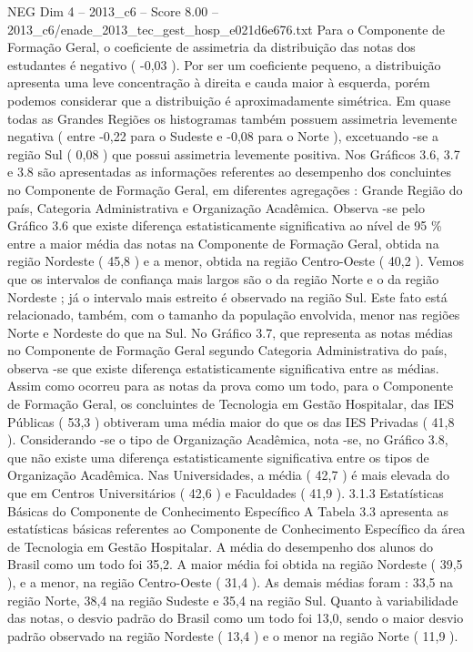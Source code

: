 \begin{textsample}{NEG Dim 4 – 2013\_c6 – Score 8.00 – 2013\_c6/enade\_2013\_tec\_gest\_hosp\_e021d6e676.txt}
Para o Componente de Formação Geral, o coeficiente de assimetria da distribuição das notas dos estudantes é negativo ( -0,03 ).
Por ser um coeficiente pequeno, a distribuição apresenta uma leve concentração à direita e cauda maior à esquerda, porém podemos considerar que a distribuição é aproximadamente simétrica.
Em quase todas as Grandes Regiões os histogramas também possuem assimetria levemente negativa ( entre -0,22 para o Sudeste e -0,08 para o Norte ), excetuando -se a região Sul ( 0,08 ) que possui assimetria levemente positiva.
Nos Gráficos 3.6, 3.7 e 3.8 são apresentadas as informações referentes ao desempenho dos concluintes no Componente de Formação Geral, em diferentes agregações : Grande Região do país, Categoria Administrativa e Organização Acadêmica.
Observa -se pelo Gráfico 3.6 que existe diferença estatisticamente significativa ao nível de 95 \% entre a maior média das notas na Componente de Formação Geral, obtida na região Nordeste ( 45,8 ) e a menor, obtida na região Centro-Oeste ( 40,2 ).
Vemos que os intervalos de confiança mais largos são o da região Norte e o da região Nordeste ; já o intervalo mais estreito é observado na região Sul.
Este fato está relacionado, também, com o tamanho da população envolvida, menor nas regiões Norte e Nordeste do que na Sul.
No Gráfico 3.7, que representa as notas médias no Componente de Formação Geral segundo Categoria Administrativa do país, observa -se que existe diferença estatisticamente significativa entre as médias.
Assim como ocorreu para as notas da prova como um todo, para o Componente de Formação Geral, os concluintes de Tecnologia em Gestão Hospitalar, das IES Públicas ( 53,3 ) obtiveram uma média maior do que os das IES Privadas ( 41,8 ).
Considerando -se o tipo de Organização Acadêmica, nota -se, no Gráfico 3.8, que não existe uma diferença estatisticamente significativa entre os tipos de Organização Acadêmica.
Nas Universidades, a média ( 42,7 ) é mais elevada do que em Centros Universitários ( 42,6 ) e Faculdades ( 41,9 ). 3.1.3 Estatísticas Básicas do Componente de Conhecimento Específico A Tabela 3.3 apresenta as estatísticas básicas referentes ao Componente de Conhecimento Específico da área de Tecnologia em Gestão Hospitalar.
A média do desempenho dos alunos do Brasil como um todo foi 35,2.
A maior média foi obtida na região Nordeste ( 39,5 ), e a menor, na região Centro-Oeste ( 31,4 ).
As demais médias foram : 33,5 na região Norte, 38,4 na região Sudeste e 35,4 na região Sul.
Quanto à variabilidade das notas, o desvio padrão do Brasil como um todo foi 13,0, sendo o maior desvio padrão observado na região Nordeste ( 13,4 ) e o menor na região Norte ( 11,9 ).

\end{textsample}
